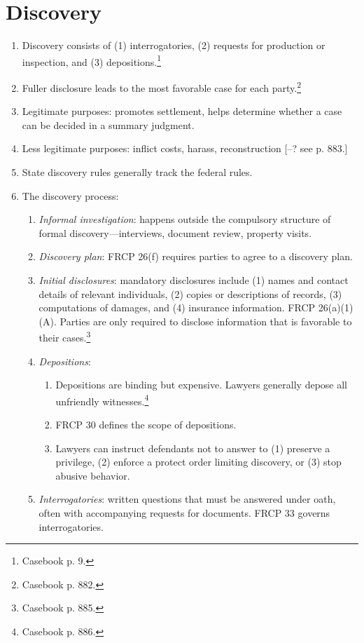 \section{Discovery}

\begin{enumerate}
    \item Discovery consists of (1) interrogatories, (2) requests for production or inspection, and (3) depositions.\footnote{Casebook p. 9.}
    \item Fuller disclosure leads to the most favorable case for each party.\footnote{Casebook p. 882.}
    \item Legitimate purposes: promotes settlement, helps determine whether a case can be decided in a summary judgment.
    \item Less legitimate purposes: inflict costs, harass, reconstruction [--? see p. 883.]
    \item State discovery rules generally track the federal rules.
    \item The discovery process:
    \begin{enumerate}
        \item \emph{Informal investigation}: happens outside the compulsory structure of formal discovery---interviews, document review, property visits.
        \item \emph{Discovery plan}: FRCP 26(f) requires parties to agree to a discovery plan.
        \item \emph{Initial disclosures}: mandatory disclosures include (1) names and contact details of relevant individuals, (2) copies or descriptions of records, (3) computations of damages, and (4) insurance information. FRCP 26(a)(1)(A). Parties are only required to disclose information that is favorable to their cases.\footnote{Casebook p. 885.}
        \item \emph{Depositions}:
        \begin{enumerate}
            \item Depositions are binding but expensive. Lawyers generally depose all unfriendly witnesses.\footnote{Casebook p. 886.}
            \item FRCP 30 defines the scope of depositions.
            \item Lawyers can instruct defendants not to answer to (1) preserve a privilege, (2) enforce a protect order limiting discovery, or (3) stop abusive behavior.
        \end{enumerate}
        \item \emph{Interrogatories}: written questions that must be answered under oath, often with accompanying requests for documents. FRCP 33 governs interrogatories.

\end{enumerate}
\end{enumerate}
